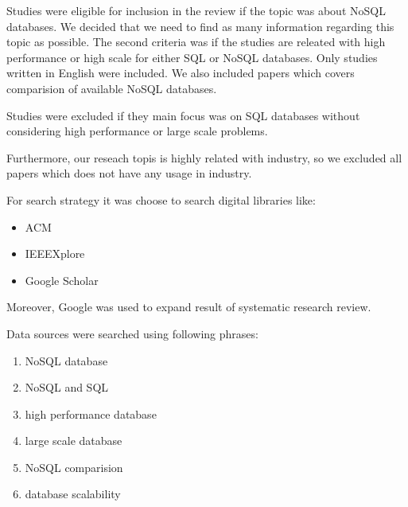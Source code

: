 \documentclass[times, 10pt,twocolumn]{article}
\begin{document}

Studies were eligible for inclusion in the review if the topic was about NoSQL databases. We decided that we need to find as many information regarding this topic as possible.
The second criteria was if the studies are releated with high performance or high scale for either SQL or NoSQL databases. Only studies written in English were included.
We also included papers which covers comparision of available NoSQL databases.

Studies were excluded if they main focus was on SQL databases without considering high performance or large scale problems. 


Furthermore, our reseach topis is highly related with industry, so we excluded all papers which does not have any usage in industry.


For search strategy it was choose to search digital libraries like:
\begin{itemize}
	\item ACM
	\item IEEEXplore
	\item Google Scholar
\end{itemize}

Moreover, Google was used to expand result of systematic research review.

Data sources were searched using following phrases:
\begin{enumerate}
    \item NoSQL database 
	\item NoSQL and SQL
	\item high performance database
	\item large scale database
	\item NoSQL comparision
	\item database scalability
\end{enumerate}

\end{document}
